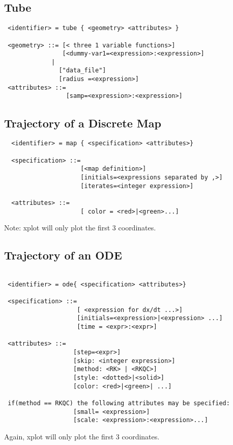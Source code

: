 \subsection*{Tube}
\begin{verbatim}
 <identifier> = tube { <geometry> <attributes> }

 <geometry> ::= [< three 1 variable functions>]
                [<dummy-var1=<expression>:<expression>]
             | 
               ["data_file"]
               [radius =<expression>]
 <attributes> ::=
                 [samp=<expression>:<expression>]
\end{verbatim}


\subsection*{Trajectory of a Discrete Map}
\begin{verbatim}
  <identifier> = map { <specification> <attributes>}	

  <specification> ::= 
                     [<map definition>]
                     [initials=<expressions separated by ,>]
                     [iterates=<integer expression>]

  <attributes> ::=
                     [ color = <red>|<green>...]
\end{verbatim}
Note: xplot will only plot the first 3 coordinates.
\subsection*{Trajectory of an ODE}
\begin{verbatim}

 <identifier> = ode{ <specification> <attributes>}

 <specification> ::=
                    [ <expression for dx/dt ...>]
                    [initials=<expression>|<expression> ...]
                    [time = <expr>:<expr>]

 <attributes> ::=
                   [step=<expr>]
                   [skip: <integer expression>]
                   [method: <RK> | <RKQC>]
                   [style: <dotted>|<solid>] 
                   [color: <red>|<green>| ...]

 if(method == RKQC) the following attributes may be specified:
                   [small= <expression>]
                   [scale: <expression>:<expression>...]
\end{verbatim}
Again, xplot will only plot the first 3 coordinates.





